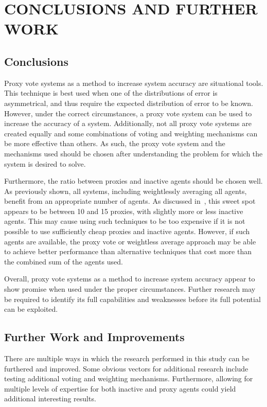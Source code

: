 %
%

\chapter{CONCLUSIONS AND FURTHER WORK}\label{ch:conclusions-and-further-work}

\section{Conclusions}\label{sec:conclusions}
Proxy vote systems as a method to increase system accuracy are situational tools.
This technique is best used when one of the distributions of error is asymmetrical,
and thus require the expected distribution of error to be known.
However, under the correct circumstances, a proxy vote system can be used to increase
the accuracy of a system.
Additionally, not all proxy vote systems are created equally and some combinations of
voting and weighting mechanisms can be more effective than others.
As such, the proxy vote system and the mechanisms used should be chosen after
understanding the problem for which the system is desired to solve.

Furthermore, the ratio between proxies and inactive agents should be chosen well.
As previously shown, all systems, including weightlessly averaging all agents, benefit
from an appropriate number of agents.
As discussed in~, this sweet spot appears to be between
10 and 15 proxies, with slightly more or less inactive agents.
This may cause using such techniques to be too expensive if it is not possible to use
sufficiently cheap proxies and inactive agents.
However, if such agents are available, the proxy vote or weightless average approach
may be able to achieve better performance than alternative techniques that cost more
than the combined sum of the agents used.

Overall, proxy vote systems as a method to increase system accuracy appear to show
promise when used under the proper circumstances.
Further research may be required to identify its full capabilities and weaknesses
before its full potential can be exploited.

\section{Further Work and Improvements}\label{sec:further-work-and-improvements}
There are multiple ways in which the research performed in this study can be
furthered and improved.
Some obvious vectors for additional research include testing additional voting and
weighting mechanisms.
Furthermore, allowing for multiple levels of expertise for both inactive and proxy
agents could yield additional interesting results.

